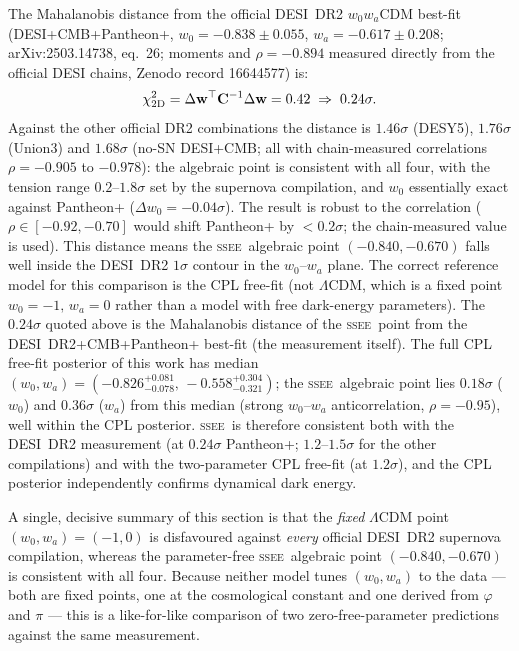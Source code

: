 \documentclass[12pt,a4paper]{article}
\newcommand{\SSEE}{\ifmmode\mathrm{SSEE}\else\textsc{ssee}\fi}
\newcommand{\LCDM}{\ifmmode\Lambda\mathrm{CDM}\else$\Lambda$CDM\fi}
\newcommand{\wz}{w_0}
\newcommand{\wa}{w_a}
\begin{document}
The Mahalanobis distance from the official DESI~DR2 $w_0w_a$CDM best-fit
(DESI+CMB+Pantheon+, $w_0=-0.838\pm0.055$, $w_a=-0.617\pm0.208$;
arXiv:2503.14738, eq.~26; moments and $\rho=-0.894$ measured directly from the
official DESI chains, Zenodo record 16644577) is:
\begin{equation}
  \chi^2_{2\rm D}
  = \Delta\mathbf{w}^\top\mathbf{C}^{-1}\Delta\mathbf{w} = 0.42
  \;\Rightarrow\; 0.24\sigma.
\end{equation}
Against the other official DR2 combinations the distance is $1.46\sigma$
(DESY5), $1.76\sigma$ (Union3) and $1.68\sigma$ (no-SN DESI+CMB; all with
chain-measured correlations $\rho=-0.905$ to $-0.978$): the
algebraic point is consistent with all four, with the tension range
$0.2$--$1.8\sigma$ set by the supernova compilation, and $w_0$ essentially
exact against Pantheon+ ($\Delta w_0=-0.04\sigma$). The result is robust to
the correlation ($\rho\in[-0.92,-0.70]$ would shift Pantheon+ by
$<0.2\sigma$; the chain-measured value is used).
This distance means the \SSEE\ algebraic point $(-0.840,-0.670)$ falls
well inside the DESI~DR2 $1\sigma$ contour in the $\wz$--$\wa$ plane.
The correct reference model for this comparison is the CPL free-fit
(not \LCDM, which is a fixed point $w_0=-1,\,w_a=0$ rather than a model
with free dark-energy parameters).  The $0.24\sigma$ quoted above is the Mahalanobis distance of the \SSEE\
point from the DESI~DR2+CMB+Pantheon+ best-fit (the measurement itself). The full CPL
free-fit posterior of this work has median
$(\wz,\wa)=(-0.826^{+0.081}_{-0.078},\,-0.558^{+0.304}_{-0.321})$; the
\SSEE\ algebraic point lies $0.18\sigma$ ($\wz$) and $0.36\sigma$ ($\wa$)
from this median (strong $w_0$--$w_a$ anticorrelation, $\rho=-0.95$), well
within the CPL posterior.
\SSEE\ is therefore consistent both with the DESI~DR2 measurement (at
$0.24\sigma$ Pantheon+; $1.2$--$1.5\sigma$ for the other compilations) and
with the two-parameter CPL free-fit (at $1.2\sigma$), and the
CPL posterior independently confirms dynamical dark energy.

A single, decisive summary of this section is that the \emph{fixed}
$\Lambda$CDM point $(w_0,w_a)=(-1,0)$ is disfavoured against \emph{every}
official DESI~DR2 supernova compilation, whereas the parameter-free \SSEE\
algebraic point $(-0.840,-0.670)$ is consistent with all four. Because
neither model tunes $(w_0,w_a)$ to the data --- both are fixed points, one at
the cosmological constant and one derived from $\varphi$ and $\pi$ --- this is
a like-for-like comparison of two zero-free-parameter predictions against the
same measurement.
\end{document}
